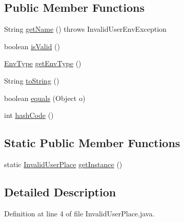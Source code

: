 \subsection*{\-Public \-Member \-Functions}
\begin{DoxyCompactItemize}
\item 
\-String \hyperlink{classlab_1_1davidahn_1_1appshuttle_1_1collect_1_1env_1_1_invalid_user_place_a8fb642e1d1361aec3371a5b1693b9477}{get\-Name} ()  throws Invalid\-User\-Env\-Exception 
\item 
boolean \hyperlink{classlab_1_1davidahn_1_1appshuttle_1_1collect_1_1env_1_1_invalid_user_place_a439d89b0ef432a57165580795a27ac4f}{is\-Valid} ()
\item 
\hyperlink{enumlab_1_1davidahn_1_1appshuttle_1_1collect_1_1env_1_1_env_type}{\-Env\-Type} \hyperlink{classlab_1_1davidahn_1_1appshuttle_1_1collect_1_1env_1_1_invalid_user_place_a34dbdf68fc11eefba618af1beac355cf}{get\-Env\-Type} ()
\item 
\-String \hyperlink{classlab_1_1davidahn_1_1appshuttle_1_1collect_1_1env_1_1_invalid_user_place_aed7adbe3f2999285daadf13a60db8863}{to\-String} ()
\item 
boolean \hyperlink{classlab_1_1davidahn_1_1appshuttle_1_1collect_1_1env_1_1_invalid_user_place_ac9b18001c74606a4e03680c72bb64b11}{equals} (\-Object o)
\item 
int \hyperlink{classlab_1_1davidahn_1_1appshuttle_1_1collect_1_1env_1_1_invalid_user_place_a456c1519edf8a8f2a0efca08b98546d7}{hash\-Code} ()
\end{DoxyCompactItemize}
\subsection*{\-Static \-Public \-Member \-Functions}
\begin{DoxyCompactItemize}
\item 
static \hyperlink{classlab_1_1davidahn_1_1appshuttle_1_1collect_1_1env_1_1_invalid_user_place}{\-Invalid\-User\-Place} \hyperlink{classlab_1_1davidahn_1_1appshuttle_1_1collect_1_1env_1_1_invalid_user_place_ab663de452499f587b2f14c4236701945}{get\-Instance} ()
\end{DoxyCompactItemize}


\subsection{\-Detailed \-Description}


\-Definition at line 4 of file \-Invalid\-User\-Place.\-java.



